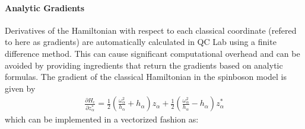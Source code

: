 \documentclass[letterpaper,10pt,english]{sphinxmanual}
\begin{document}
\paragraph{Analytic Gradients}
\label{\detokenize{user_guide/model_dev:analytic-gradients}}
\sphinxAtStartPar
Derivatives of the Hamiltonian with respect to each classical coordinate (refered to here as gradients) are automatically calculated in QC Lab using a
finite difference method. This can cause significant computational overhead and can be avoided by providing ingredients
that return the gradients based on analytic formulas. The gradient of the classical Hamiltonian in the spin\sphinxhyphen{}boson model is given by
\begin{equation*}
\begin{split}\frac{\partial H_{\mathrm{c}}}{\partial z^{*}_{\alpha}} = \frac{1}{2}\left(\frac{\omega^{2}_{\alpha}}{h_{\alpha}} + h_{\alpha}\right)z_{\alpha} +
        \frac{1}{2}\left(\frac{\omega^{2}_{\alpha}}{h_{\alpha}} - h_{\alpha}\right)z^{*}_{\alpha}\end{split}
\end{equation*}
\sphinxAtStartPar
which can be implemented in a vectorized fashion as:
\end{document}
